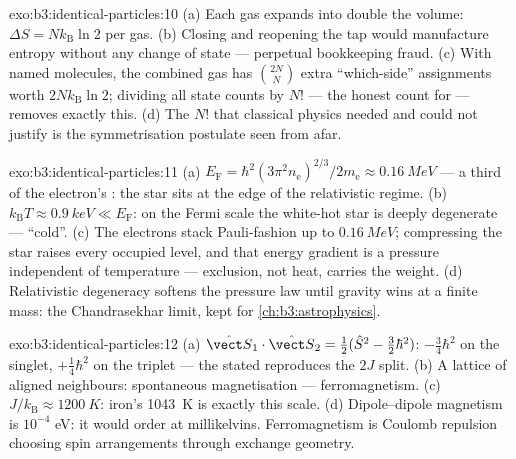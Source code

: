 \begin{solution}{exo:b3:identical-particles:10}
(a) Each gas expands into double the volume: $\Delta S =
Nk_{\text{B}}\ln2$ per gas. (b) Closing and reopening the tap
would manufacture entropy without any change of state ---
perpetual bookkeeping fraud. (c) With named molecules, the
combined gas has $\binom{2N}{N}$ extra ``which-side'' assignments
worth $2Nk_{\text{B}}\ln2$; dividing all state counts by $N!$ ---
the honest count for  --- removes exactly this.
(d) The $N!$ that classical physics needed and could not justify
is the symmetrisation postulate seen from afar.
\end{solution}

\begin{solution}{exo:b3:identical-particles:11}
(a) $E_{\text{F}} = \hbar^2(3\pi^2n_{\text{e}})^{2/3}/2m_{\text{e}}
\approx \qty{0.16}{MeV}$ --- a third of the electron's : the star sits at the edge of the relativistic regime. (b)
$k_{\text{B}}T \approx \qty{0.9}{keV} \ll E_{\text{F}}$: on the
Fermi scale the white-hot star is deeply degenerate --- ``cold''.
(c) The electrons stack Pauli-fashion up to
$\qty{0.16}{MeV}$; compressing the star raises every occupied
level, and that energy gradient is a pressure independent of
temperature --- exclusion, not heat, carries the weight. (d)
Relativistic degeneracy softens the pressure law until gravity
wins at a finite mass: the Chandrasekhar limit, kept for
\cref{ch:b3:astrophysics}.
\end{solution}

\begin{solution}{exo:b3:identical-particles:12}
(a) $\hat{\vect S}_1\cdot\hat{\vect S}_2 = \tfrac12(\hat S^2 -
\tfrac32\hbar^2)$: $-\tfrac34\hbar^2$ on the singlet,
$+\tfrac14\hbar^2$ on the triplet --- the stated 
reproduces the $2J$ split. (b) A lattice of aligned neighbours:
spontaneous magnetisation --- ferromagnetism. (c) $J/k_{\text{B}}
\approx \qty{1200}{K}$: iron's \qty{1043}{K} is exactly this
scale. (d) Dipole--dipole magnetism is $10^{-4}$ eV: it would
order at millikelvins. Ferromagnetism is Coulomb repulsion
choosing spin arrangements through exchange geometry.
\end{solution}

